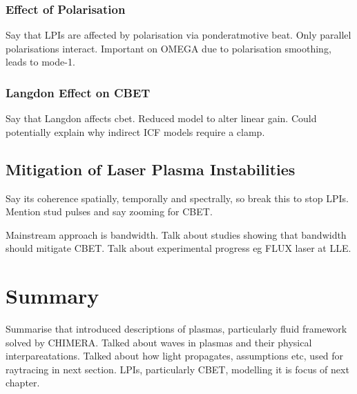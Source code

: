 \subsubsection{Effect of Polarisation}%
\label{sec:theory_cbet_polarisation}

Say that LPIs are affected by polarisation via ponderatmotive beat.
Only parallel polarisations interact.
Important on OMEGA due to polarisation smoothing, leads to mode-1.

\subsubsection{Langdon Effect on CBET}%
\label{sec:theory_cbet_langdon}

Say that Langdon affects cbet.
Reduced model to alter linear gain.
Could potentially explain why indirect ICF models require a clamp.

\subsection{Mitigation of Laser Plasma Instabilities}%
\label{sec:theory_lpi_mitigation}

Say its coherence spatially, temporally and spectrally, so break this to stop LPIs.
Mention stud pulses and say zooming for CBET.

Mainstream approach is bandwidth.
Talk about studies showing that bandwidth should mitigate CBET.
Talk about experimental progress eg FLUX laser at LLE.


\section{Summary}%
\label{sec:theory_summary}

Summarise that introduced descriptions of plasmas, particularly fluid framework solved by CHIMERA.
Talked about waves in plasmas and their physical interpareatations.
Talked about how light propagates, assumptions etc, used for raytracing in next section.
LPIs, particularly CBET, modelling it is focus of next chapter.
